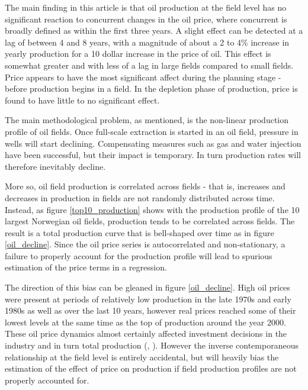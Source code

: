 \documentclass[12pt]{article}
\begin{document}
The main finding in this article is that oil production at the field level has no significant reaction to concurrent changes in the oil price, where concurrent is broadly defined as within the first three years.  A slight effect can be detected at a lag of between 4 and 8 years, with a magnitude of about a 2 to 4\% increase in yearly production for a 10 dollar increase in the price of oil.  This effect is somewhat greater and with less of a lag in large fields compared to small fields.  Price appears to have the most significant affect during the planning stage - before production begins in a field.  In the depletion phase of production, price is found to have little to no significant effect.  

The main methodological problem, as mentioned, is the non-linear production profile of oil fields.  Once full-scale extraction is started in an oil field, pressure in wells will start declining. Compensating measures such as gas and water injection have been successful, but their impact is temporary. In turn production rates will therefore inevitably decline.

More so, oil field production is correlated across fields - that is, increases and decreases in production in fields are not randomly distributed across time.  Instead, as figure \ref{top10_production} shows with the production profile of the 10 largest Norwegian oil fields, production tends to be correlated across fields.  The result is a total production curve that is bell-shaped over time as in figure \ref{oil_decline}.  Since the oil price series is autocorrelated and non-stationary, a failure to properly account for the production profile will lead to spurious estimation of the price terms in a regression.

The direction of this bias can be gleaned in figure \ref{oil_decline}.  High oil prices were present at periods of relatively low production in the late 1970s and early 1980s as well as over the last 10 years, however real prices reached some of their lowest levels at the same time as the top of production around the year 2000. These oil price dynamics almost certainly affected investment decisions in the industry and in turn total production (\citep{osmundsen_is_2007}, \citep{aune_financial_2010}). However the inverse contemporaneous relationship at the field level is entirely accidental, but will heavily bias the estimation of the effect of price on production if field production profiles are not properly accounted for. 
\end{document}
